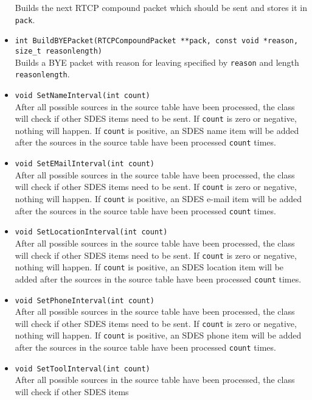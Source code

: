 \documentclass[12pt,a4paper]{article}
\begin{document}
\begin{itemize}
						Builds the next RTCP compound packet which should be
						sent and stores it in {\tt pack}.
					\item {\tt int BuildBYEPacket(RTCPCompoundPacket **pack, const void *reason, size\_t reasonlength)}\\
						Builds a BYE packet with reason for leaving
						specified by {\tt reason} and length
						{\tt reasonlength}.
					\item {\tt void SetNameInterval(int count)}\\
						After all possible sources in the source table have been
						processed, the class will check if other SDES items
						need to be sent. If {\tt count} is zero or negative, nothing
						will happen. If {\tt count} is positive, an SDES name
						item will be added after the sources in the source table have
						been processed {\tt count} times.
					\item {\tt void SetEMailInterval(int count)}\\
						After all possible sources in the source table have been
						processed, the class will check if other SDES items
						need to be sent. If {\tt count} is zero or negative, nothing
						will happen. If {\tt count} is positive, an SDES e-mail
						item will be added after the sources in the source table have
						been processed {\tt count} times.
					\item {\tt void SetLocationInterval(int count)}\\
						After all possible sources in the source table have been
						processed, the class will check if other SDES items
						need to be sent. If {\tt count} is zero or negative, nothing
						will happen. If {\tt count} is positive, an SDES location
						item will be added after the sources in the source table have
						been processed {\tt count} times.
					\item {\tt void SetPhoneInterval(int count)}\\
						After all possible sources in the source table have been
						processed, the class will check if other SDES items
						need to be sent. If {\tt count} is zero or negative, nothing
						will happen. If {\tt count} is positive, an SDES phone
						item will be added after the sources in the source table have
						been processed {\tt count} times.
					\item {\tt void SetToolInterval(int count)}\\
						After all possible sources in the source table have been
						processed, the class will check if other SDES items

\end{itemize}
\end{document}
